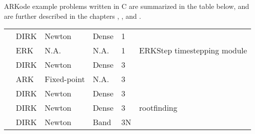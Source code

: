\documentclass[letterpaper,10pt,english]{sphinxmanual}
\begin{document}
ARKode example problems written in C are summarized in the table
below, and are further described in the chapters {\hyperref[\detokenize{c_serial:serial-c}]{}},
{\hyperref[\detokenize{c_openmp:openmp-c}]{}}, {\hyperref[\detokenize{c_parallel:parallel-c}]{}} and {\hyperref[\detokenize{c_parhyp:parhyp-c}]{}}.


\begin{savenotes}\sphinxattablestart
\centering
\begin{tabulary}{\linewidth}[t]{|T|T|T|T|T|T|}
\hline
{}\relax &\relax &\relax &\relax &\relax &\relax \\
\hline
{\hyperref[\detokenize{c_serial:ark-analytic}]{}}
&
DIRK
&
Newton
&
Dense
&
1
&\\
\hline
{\hyperref[\detokenize{c_serial:ark-analytic-nonlin}]{}}
&
ERK
&
N.A.
&
N.A.
&
1
&
ERKStep timestepping module
\\
\hline
{\hyperref[\detokenize{c_serial:ark-brusselator}]{}}
&
DIRK
&
Newton
&
Dense
&
3
&\\
\hline
{\hyperref[\detokenize{c_serial:ark-brusselator-fp}]{}}
&
ARK
&
Fixed-point
&
N.A.
&
3
&\\
\hline
{\hyperref[\detokenize{c_serial:ark-robertson}]{}}
&
DIRK
&
Newton
&
Dense
&
3
&\\
\hline
{\hyperref[\detokenize{c_serial:ark-robertson-root}]{}}
&
DIRK
&
Newton
&
Dense
&
3
&
rootfinding
\\
\hline
{\hyperref[\detokenize{c_serial:ark-brusselator1d}]{}}
&
DIRK
&
Newton
&
Band
&
3N
&\\

\end{tabulary}
\end{savenotes}
\end{document}
